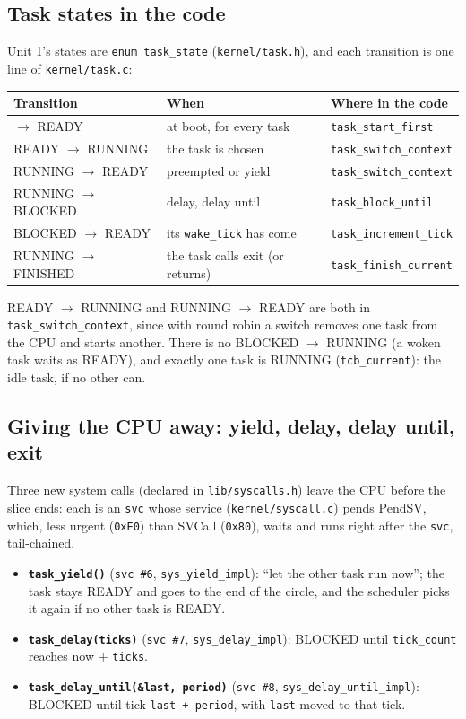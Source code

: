 \subsection{Task states in the code}
Unit 1's states are \texttt{enum task\_state} (\texttt{kernel/task.h}), and each transition is one line of \texttt{kernel/task.c}:
\begin{center}
    \begin{tabular}{l l l}
        \hline
        \textbf{Transition} & \textbf{When} & \textbf{Where in the code} \\
        \hline
        $\to$ READY & at boot, for every task & \texttt{task\_start\_first} \\
        READY $\to$ RUNNING & the task is chosen & \texttt{task\_switch\_context} \\
        RUNNING $\to$ READY & preempted or yield & \texttt{task\_switch\_context} \\
        RUNNING $\to$ BLOCKED & delay, delay until & \texttt{task\_block\_until} \\
        BLOCKED $\to$ READY & its \texttt{wake\_tick} has come & \texttt{task\_increment\_tick} \\
        RUNNING $\to$ FINISHED & the task calls exit (or returns) & \texttt{task\_finish\_current} \\
        \hline
    \end{tabular}
\end{center}
READY $\to$ RUNNING and RUNNING $\to$ READY are both in \texttt{task\_switch\_context}, since with round robin a switch removes one task from the CPU and starts another. There is no BLOCKED $\to$ RUNNING (a woken task waits as READY), and exactly one task is RUNNING (\texttt{tcb\_current}): the idle task, if no other can.

\subsection{Giving the CPU away: yield, delay, delay until, exit}
Three new system calls (declared in \texttt{lib/syscalls.h}) leave the CPU before the slice ends: each is an \texttt{svc} whose service (\texttt{kernel/syscall.c}) pends PendSV, which, less urgent (\texttt{0xE0}) than SVCall (\texttt{0x80}), waits and runs right after the \texttt{svc}, tail-chained.
\begin{itemize}
    \item \textbf{\texttt{task\_yield()}} (\texttt{svc \#6}, \texttt{sys\_yield\_impl}): ``let the other task run now''; the task stays READY and goes to the end of the circle, and the scheduler picks it again if no other task is READY.
    \item \textbf{\texttt{task\_delay(ticks)}} (\texttt{svc \#7}, \texttt{sys\_delay\_impl}): BLOCKED until \texttt{tick\_count} reaches now $+$ \texttt{ticks}.
    \item \textbf{\texttt{task\_delay\_until(\&last, period)}} (\texttt{svc \#8}, \texttt{sys\_delay\_until\_impl}): BLOCKED until tick \texttt{last + period}, with \texttt{last} moved to that tick.
\end{itemize}

